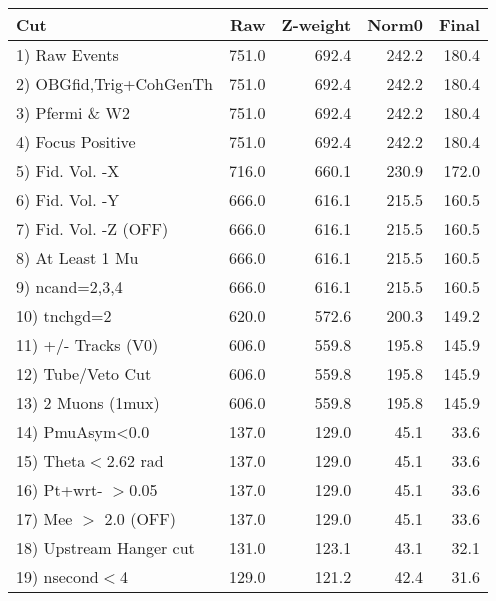 \begin{table}[h!]\centering
 \begin{tabular}{||l||r|r|r|r||}
 \hline
 \hline
 Cut & Raw & Z-weight & Norm0 & Final \\
 \hline
  1) Raw Events           &       751.0 &       692.4 &       242.2 &       180.4 \\
  2) OBGfid,Trig+CohGenTh &       751.0 &       692.4 &       242.2 &       180.4 \\
  3) Pfermi \& W2         &       751.0 &       692.4 &       242.2 &       180.4 \\
  4) Focus Positive       &       751.0 &       692.4 &       242.2 &       180.4 \\
  5) Fid. Vol. -X         &       716.0 &       660.1 &       230.9 &       172.0 \\
  6) Fid. Vol. -Y         &       666.0 &       616.1 &       215.5 &       160.5 \\
  7) Fid. Vol. -Z (OFF)   &       666.0 &       616.1 &       215.5 &       160.5 \\
  8) At Least 1 Mu        &       666.0 &       616.1 &       215.5 &       160.5 \\
  9) ncand=2,3,4          &       666.0 &       616.1 &       215.5 &       160.5 \\
 10) tnchgd=2             &       620.0 &       572.6 &       200.3 &       149.2 \\
 11) +/- Tracks (V0)      &       606.0 &       559.8 &       195.8 &       145.9 \\
 12) Tube/Veto Cut        &       606.0 &       559.8 &       195.8 &       145.9 \\
 13) 2 Muons (1mux)       &       606.0 &       559.8 &       195.8 &       145.9 \\
 14) PmuAsym<0.0          &       137.0 &       129.0 &        45.1 &        33.6 \\
 15) Theta$<$2.62 rad     &       137.0 &       129.0 &        45.1 &        33.6 \\
 16) Pt+wrt- $>$0.05      &       137.0 &       129.0 &        45.1 &        33.6 \\
 17) Mee $>$ 2.0  (OFF)   &       137.0 &       129.0 &        45.1 &        33.6 \\
 18) Upstream Hanger cut  &       131.0 &       123.1 &        43.1 &        32.1 \\
 19) nsecond$<$4          &       129.0 &       121.2 &        42.4 &        31.6 \\

\end{tabular}
\end{table}
